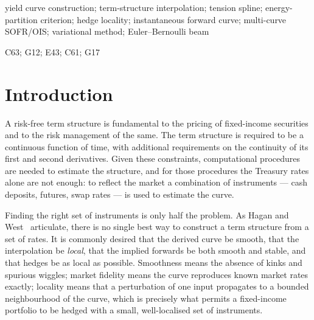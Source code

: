 \documentclass[]{interact}
\theoremstyle{plain}
\begin{document}
\begin{keywords}
yield curve construction; term-structure interpolation; tension spline;
energy-partition criterion; hedge locality; instantaneous forward curve;
multi-curve SOFR/OIS; variational method; Euler--Bernoulli beam
\end{keywords}

\begin{jelcode}
C63; G12; E43; C61; G17
\end{jelcode}

\section{Introduction}
A risk-free term structure is fundamental to the pricing of fixed-income securities and to
the risk management of the same. The term structure is required to be a continuous function
of time, with additional requirements on the continuity of its first and second derivatives.
Given these constraints, computational procedures are needed to estimate the structure, and
for those procedures the Treasury rates alone are not enough: to reflect the market a
combination of instruments --- cash deposits, futures, swap rates --- is used to estimate the
curve.

Finding the right set of instruments is only half the problem. As Hagan and West~\cite{Hagan}
articulate, there is no single best way to construct a term structure from a set of rates.
It is commonly desired that the derived curve be smooth, that the interpolation be
\emph{local}, that the implied forwards be both smooth and stable, and that hedges be as
local as possible. Smoothness means the absence of kinks and spurious wiggles; market
fidelity means the curve reproduces known market rates exactly; locality means that a
perturbation of one input propagates to a bounded neighbourhood of the curve, which is
precisely what permits a fixed-income portfolio to be hedged with a small, well-localised set
of instruments.
\end{document}
